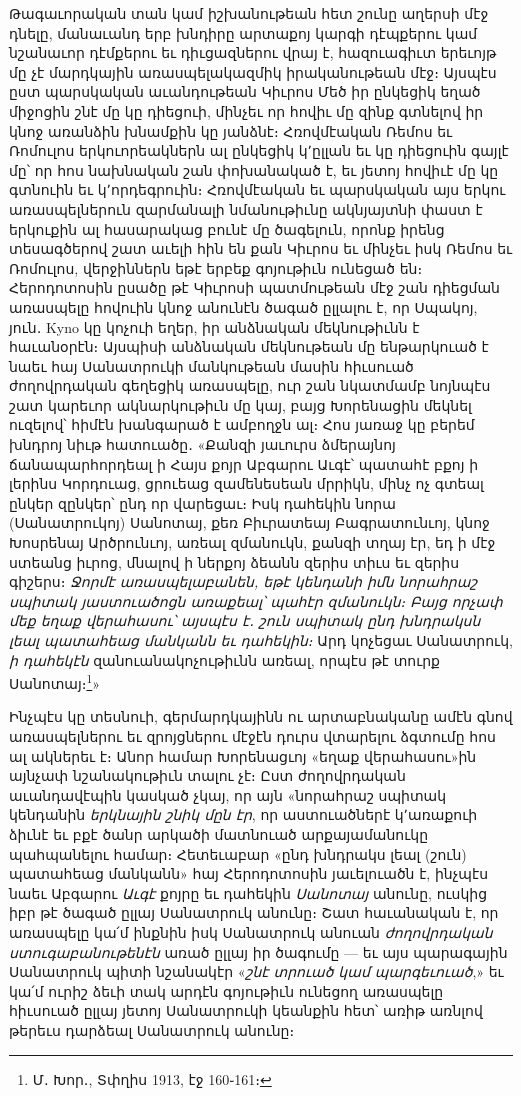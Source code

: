 \documentclass{article}
\begin{document}
{Թագաւորական տան կամ իշխանութեան հետ շունը աղերսի մէջ դնելը, մանաւանդ երբ խնդիրը արտաքոյ կարգի դէպքերու կամ նշանաւոր դէմքերու եւ դիւցազներու վրայ է, հազուագիւտ երեւոյթ մը չէ մարդկային առասպելակազմիկ իրականութեան մէջ։ Այսպէս ըստ պարսկական աւանդութեան Կիւրոս Մեծ իր ընկեցիկ եղած միջոցին շնէ մը կը դիեցուի, մինչեւ որ հովիւ մը զինք գտնելով իր կնոջ առանձին խնամքին կը յանձնէ։ Հռովմէական Ռեմոս եւ Ռոմուլոս երկուորեակներն ալ ընկեցիկ կ՚ըլլան եւ կը դիեցուին գայլէ մը՝ որ հոս նախնական շան փոխանակած է, եւ յետոյ հովիւէ մը կը գտնուին եւ կ՚որդեգրուին։ Հռովմէական եւ պարսկական այս երկու առասպելներուն զարմանալի նմանութիւնը ակնյայտնի փաստ է երկուքին ալ հասարակաց բունէ մը ծագելուն, որոնք իրենց տեսագծերով շատ աւելի հին են քան Կիւրոս եւ մինչեւ իսկ Ռեմոս եւ Ռոմուլոս, վերջիններն եթէ երբեք գոյութիւն ունեցած են։ Հերոդոտոսին ըսածը թէ Կիւրոսի պատմութեան մէջ շան դիեցման առասպելը հովուին կնոջ անունէն ծագած ըլլալու է, որ Սպակոյ, յուն․ Kyno կը կոչուի եղեր, իր անձնական մեկնութիւնն է հաւանօրէն։ Այսպիսի անձնական մեկնութեան մը ենթարկուած է նաեւ հայ Սանատրուկի մանկութեան մասին հիւսուած ժողովրդական գեղեցիկ առասպելը, ուր շան նկատմամբ նոյնպէս շատ կարեւոր ակնարկութիւն մը կայ, բայց Խորենացին մեկնել ուզելով՝ հիմէն խանգարած է ամբողջն ալ։ Հոս յառաջ կը բերեմ խնդրոյ նիւթ հատուածը․ «Քանզի յաւուրս ձմերայնոյ ճանապարհորդեալ ի Հայս քոյր Աբգարու Աւգէ՝ պատահէ բքոյ ի լերինս Կորդուաց, ցրուեաց զամենեսեան մրրիկն, մինչ ոչ գտեալ ընկեր զընկեր՝ ընդ որ վարեցաւ։ Իսկ դահեկին նորա (Սանատրուկոյ) Սանոտայ, քեռ Բիւրատեայ Բագրատունւոյ, կնոջ Խոսրենայ Արծրունւոյ, առեալ զմանուկն, քանզի տղայ էր, եդ ի մէջ ստեանց իւրոց, մնալով ի ներքոյ ձեանն զերիս տիւս եւ զերիս գիշերս։ \emph{Ջորմէ առասպելաբանեն, եթէ կենդանի իմն նորահրաշ սպիտակ յաստուածոցն առաքեալ՝ պահէր զմանուկն։ Բայց որչափ մեք եղաք վերահասու՝ այսպէս է․ շուն սպիտակ ընդ խնդրակսն լեալ պատահեաց մանկանն եւ դահեկին։} Արդ կոչեցաւ Սանատրուկ, \emph{ի դահեկէն} զանուանակոչութիւնն առեալ, որպէս թէ տուրք Սանոտայ։\footnote{Մ․ Խոր․, Տփղիս 1913, էջ 160֊161։}»

Ինչպէս կը տեսնուի, գերմարդկայինն ու արտաբնականը ամէն գնով առասպելներու եւ զրոյցներու մէջէն դուրս վտարելու ձգտումը հոս ալ ակներեւ է։ Անոր համար Խորենացւոյ «եղաք վերահասու»ին այնչափ նշանակութիւն տալու չէ։ Ըստ ժողովրդական աւանդավէպին կասկած չկայ, որ այն «նորահրաշ սպիտակ կենդանին \emph{երկնային շնիկ մըն էր}, որ աստուածներէ կ՚առաքուի ձիւնէ եւ բքէ ծանր արկածի մատնուած արքայամանուկը պահպանելու համար։ Հետեւաբար «ընդ խնդրակս լեալ (շուն) պատահեաց մանկանն» հայ Հերոդոտոսին յաւելուածն է, ինչպէս նաեւ Աբգարու \emph{Աւգէ} քոյրը եւ դահեկին \emph{Սանոտայ} անունը, ուսկից իբր թէ ծագած ըլլայ Սանատրուկ անունը։ Շատ հաւանական է, որ առասպելը կա՛մ ինքնին իսկ Սանատրուկ անուան \emph{ժողովրդական ստուգաբանութենէն} առած ըլլայ իր ծագումը — եւ այս պարագային Սանատրուկ պիտի նշանակէր «\emph{շնէ տրուած կամ պարգեւուած},» եւ կա՛մ ուրիշ ձեւի տակ արդէն գոյութիւն ունեցող առասպելը հիւսուած ըլլայ յետոյ Սանատրուկի կեանքին հետ՝ առիթ առնլով թերեւս դարձեալ Սանատրուկ անունը։

}
\end{document}

